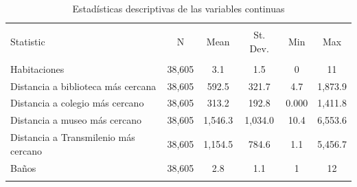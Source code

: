 
\begin{table}[!htbp] \centering 
  \caption{Estadísticas descriptivas de las variables continuas} 
  \label{tab:resumen_continuas} 
\begin{tabular}{@{\extracolsep{5pt}}lccccc} 
\\[-1.8ex]\hline 
\hline \\[-1.8ex] 
Statistic & \multicolumn{1}{c}{N} & \multicolumn{1}{c}{Mean} & \multicolumn{1}{c}{St. Dev.} & \multicolumn{1}{c}{Min} & \multicolumn{1}{c}{Max} \\ 
\hline \\[-1.8ex] 
Habitaciones & 38,605 & 3.1 & 1.5 & 0 & 11 \\ 
Distancia a biblioteca más cercana & 38,605 & 592.5 & 321.7 & 4.7 & 1,873.9 \\ 
Distancia a colegio más cercano & 38,605 & 313.2 & 192.8 & 0.000 & 1,411.8 \\ 
Distancia a museo más cercano & 38,605 & 1,546.3 & 1,034.0 & 10.4 & 6,553.6 \\ 
Distancia a Transmilenio más cercano & 38,605 & 1,154.5 & 784.6 & 1.1 & 5,456.7 \\ 
Baños & 38,605 & 2.8 & 1.1 & 1 & 12 \\ 
\hline \\[-1.8ex] 
\end{tabular} 
\end{table} 
